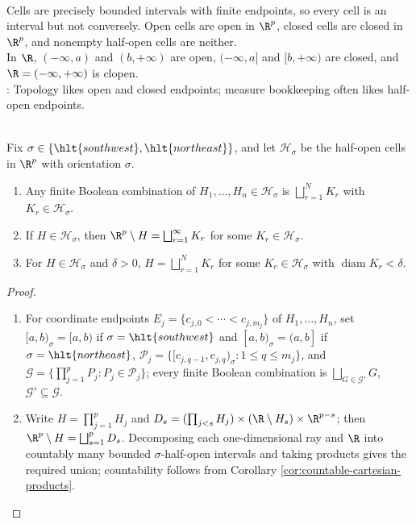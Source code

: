 \begin{remark} \label{rem:cell-interval-topological-conventions} \\
Cells are precisely bounded intervals with finite endpoints, so every cell is an interval but not conversely. Open cells are open in $\R^p$, closed cells are closed in $\R^p$, and nonempty half-open cells are neither.\\
In $\R$, $(-\infty,a)$ and $(b,+\infty)$ are open, $(-\infty,a]$ and $[b,+\infty)$ are closed, and $\R=(-\infty,+\infty)$ is clopen.\\
: Topology likes open and closed endpoints; measure bookkeeping often likes half-open endpoints.
\end{remark}

\begin{proposition} \label{prop:half-open-cell-calculus-and-subdivision} \\
Fix $\sigma\in\{\hlt{southwest},\hlt{northeast}\}$, and let $\mathcal{H}_\sigma$ be the half-open cells in $\R^p$ with orientation $\sigma$.
\begin{enumerate}[label=(\roman*)]
\setlength{\itemsep}{0pt}
\item Any finite Boolean combination of $H_1,\ldots,H_n\in\mathcal{H}_\sigma$ is $\bigsqcup_{r=1}^{N}K_r$ with $K_r\in\mathcal{H}_\sigma$.
\item If $H\in\mathcal{H}_\sigma$, then $\R^p\setminus H=\bigsqcup_{r=1}^{\infty}K_r$ for some $K_r\in\mathcal{H}_\sigma$.
\item For $H\in\mathcal{H}_\sigma$ and $\delta>0$, $H=\bigsqcup_{r=1}^{N}K_r$ for some $K_r\in\mathcal{H}_\sigma$ with $\operatorname{diam}K_r<\delta$.
\end{enumerate}
\begin{proof}
\begin{enumerate}[label=(\roman*)]
\setlength{\itemsep}{0pt}
\item For coordinate endpoints $E_j=\{c_{j,0}<\cdots<c_{j,m_j}\}$ of $H_1,\ldots,H_n$, set $[a,b)_\sigma=[a,b)$ if $\sigma=\hlt{southwest}$ and $[a,b)_\sigma=(a,b]$ if $\sigma=\hlt{northeast}$, $\mathcal{P}_j=\{[c_{j,q-1},c_{j,q})_\sigma:1\leq q\leq m_j\}$, and $\mathcal{G}=\{\prod_{j=1}^{p}P_j:P_j\in\mathcal{P}_j\}$; every finite Boolean combination is $\bigsqcup_{G\in\mathcal{G}'}G$, $\mathcal{G}'\subseteq\mathcal{G}$.
\item Write $H=\prod_{j=1}^{p}H_j$ and $D_s=(\prod_{j<s}H_j)\times(\R\setminus H_s)\times\R^{p-s}$; then $\R^p\setminus H=\bigsqcup_{s=1}^{p}D_s$. Decomposing each one-dimensional ray and $\R$ into countably many bounded $\sigma$-half-open intervals and taking products gives the required union; countability follows from Corollary \ref{cor:countable-cartesian-products}.

\end{enumerate}
\end{proof}
\end{proposition}
